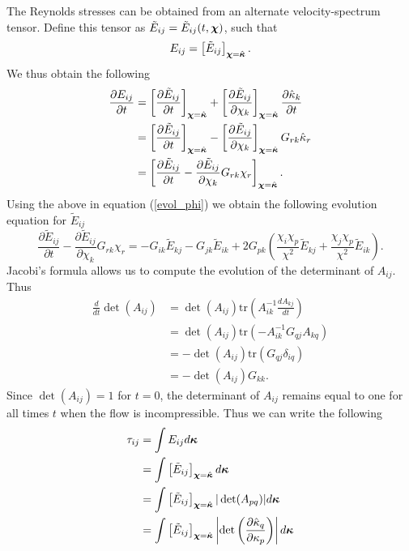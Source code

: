 \documentclass[oneside,a4paper,11pt]{report}
\newcommand{\rs}{\tau}          %
\newcommand{\est}{E}            %
\newcommand{\kappavec}{\boldsymbol{\kappa}}
\begin{document}
The Reynolds stresses can be obtained from an alternate velocity-spectrum tensor. Define this tensor as $\tilde{\est}_{ij} = \tilde{\est}_{ij}(t,\chivec)$, such that
\begin{equation}
\est_{ij} = \left [ \tilde{\est}_{ij} \right ]_{\chivec = \hat{\kappavec}}.
\end{equation}
We thus obtain the following
\begin{align}
\frac{\partial{\est_{ij}}}{\partial t} &= \left [ \frac{ \partial \tilde{\est}_{ij} }{\partial t} \right ]_{\chivec = \hat{\kappavec}} + \left [ \frac{\partial \tilde{\est}_{ij} }{\partial \chi_k} \right ]_{\chivec = \hat{\kappavec} } \frac{\partial \hat{\kappa}_k }{\partial t} \nonumber \\
& = \left [ \frac{\partial \tilde{\est}_{ij} }{\partial t} \right ]_{\chivec = \hat{\kappavec} } - \left [ \frac{\partial \tilde{\est}_{ij} }{\partial \chi_k} \right ]_{\chivec = \hat{\kappavec} } G_{rk} \hat{\kappa}_r \nonumber \\
& = \left [ \frac{\partial \tilde{\est}_{ij}}{\partial t} - \frac{\partial \tilde{\est}_{ij}}{\partial \chi_k} G_{rk}\chi_r \right ]_{\chivec = \hat{\kappavec} }.
\end{align}
Using the above in equation (\ref{evol_phi}) we obtain the following evolution equation for $\tilde{\est}_{ij}$
\begin{equation}
\frac{\partial \tilde{\est}_{ij}}{\partial t} - \frac{\partial \tilde{\est}_{ij}}{\partial \chi_k} G_{rk}\chi_r =
-G_{ik} \tilde{\est}_{kj} - G_{jk}\tilde{\est}_{ik} + 2 G_{pk} \left ( \frac{\chi_i \chi_p}{\chi^2} \tilde{\est}_{kj} + \frac{\chi_j \chi_p}{\chi^2} \tilde{\est}_{ik} \right ).
\end{equation}
Jacobi's formula allows us to compute the evolution of the determinant of $A_{ij}$. Thus
\begin{align}
\frac{d}{dt} \det(A_{ij}) & = \det(A_{ij}) \text{tr}\left( A^{-1}_{ik} \frac{d A_{kj}}{dt} \right ) \nonumber \\
& = \det(A_{ij}) \text{tr} ( -A^{-1}_{ik} G_{qj} A_{kq} ) \nonumber \\
& = -\det(A_{ij}) \text{tr} (G_{qj} \delta_{iq}) \nonumber \\
& = -\det(A_{ij}) G_{kk}.
\end{align}
Since $\det(A_{ij}) = 1$ for $t = 0$, the determinant of $A_{ij}$ remains equal to one for all times $t$ when the flow is incompressible. Thus we can write the following 
\begin{align}
\rs_{ij} &= \int \est_{ij} d\kappavec \nonumber \\
&= \int \left [ \tilde{\est}_{ij} \right ]_{\chivec = \hat{\kappavec} } d\kappavec \nonumber \\
&= \int \left [ \tilde{\est}_{ij} \right ]_{\chivec = \hat{\kappavec}} | \det(A_{pq}) | d\kappavec \nonumber \\
&= \int \left [ \tilde{\est}_{ij} \right ]_{\chivec = \hat{\kappavec}} \left | \det \left (\frac{\partial \hat{\kappa}_q}{\partial \kappa_p} \right ) \right | d\kappavec 
\end{align}
\end{document}
